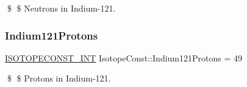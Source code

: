 \$ \$ Neutrons in Indium-\/121. \mbox{\label{group___isotope_const-_indium-_in121_ga302257a4824a5b45efda5d1ecb86fcd1}} 
\subsubsection{\texorpdfstring{Indium121\+Protons}{Indium121Protons}}
{\footnotesize\ttfamily \mbox{\hyperlink{group___isotope_const-_macros_ga5f18360b3e99483a35c32d789e62621c}{I\+S\+O\+T\+O\+P\+E\+C\+O\+N\+S\+T\+\_\+\+I\+NT}} Isotope\+Const\+::\+Indium121\+Protons = 49}

\$ \$ Protons in Indium-\/121. 